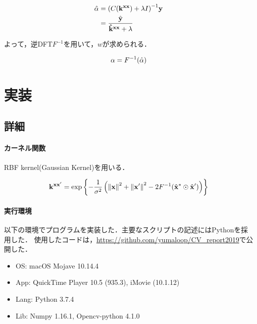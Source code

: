 \documentclass[11pt,a4j]{jarticle}
\newcommand\norm[1]{\left\lVert#1\right\rVert}
\begin{document}
      \begin{align}
        \hat{\bf \alpha} &= { ( C( {\bf {k}^{xx}} ) + \lambda I ) }^{-1} {\bf y} \\
                &= \frac{\hat{\bf y}}{ {\bf {\hat{k}}^{xx} } + \lambda }
      \end{align}

      よって，逆DFT${F}^{-1}$を用いて，$w$が求められる．

      \begin{align}
        {\bf \alpha} = {F}^{-1}( \hat{\bf \alpha} )
      \end{align}
  
      
  \section{実装}

    \subsection{詳細}

      \paragraph{カーネル関数}

      RBF kernel(Gaussian Kernel)を用いる．

      \begin{align}
        {\bf {k}^{xx'}} = \exp \left\{ - \frac{1}{\sigma^2} \left( \norm{\bf x}^{2} + \norm{\bf x'}^{2} - 2 {F}^{-1} ( \hat{{\bf x}}^{*} \odot \hat{\bf x}' ) \right) \right\}
      \end{align}

      \paragraph{実行環境}
      以下の環境でプログラムを実装した．主要なスクリプトの記述にはPythonを採用した．
      使用したコードは，\url{https://github.com/yumaloop/CV_report2019}で公開した．

      \begin{itemize}
        \item OS: macOS Mojave 10.14.4
        \item App: QuickTime Player 10.5 (935.3), iMovie (10.1.12)
        \item Lang: Python 3.7.4
        \item Lib: Numpy 1.16.1, Opencv-python 4.1.0
      \end{itemize}
\end{document}
